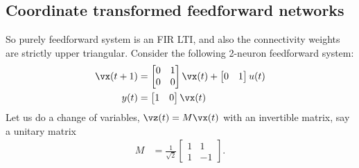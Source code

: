 \documentclass[a4paper,11pt]{exam}
\newcounter{ct}
\begin{document}
\begin{questions}
\subsection{Coordinate transformed feedforward networks}
So purely feedforward system is an FIR LTI, and also the connectivity weights are strictly upper triangular.
\question \label{q:rotff}
Consider the following 2-neuron feedforward system:
\begin{align}\label{eq:dtlds:lti:1}
    \vx(t+1) &= 
    \begin{bmatrix}
	0 & 1\\
	0 & 0
    \end{bmatrix}
    \vx(t) + 
    \begin{bmatrix}
	0 & 1
    \end{bmatrix}
    u(t)
    \\
    y(t) &= 
    \begin{bmatrix}
	1 & 0
    \end{bmatrix}
    \vx(t)
\end{align}
Let us do a change of variables, $\vz(t) = M \vx(t)$ with an invertible matrix, say a unitary matrix
\begin{align}
    M &=
    \frac{1}{\sqrt{2}}
    \begin{bmatrix}
	1 & 1\\
	1 & -1
    \end{bmatrix}.
\end{align}


\end{questions}
\end{document}
